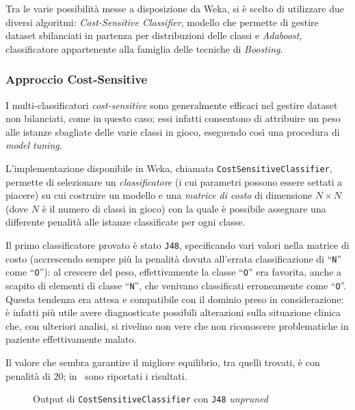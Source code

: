 Tra le varie possibilità messe a disposizione da Weka, si è scelto di utilizzare due diversi algoritmi:
\emph{Cost-Sensitive Classifier}, modello che permette di gestire dataset sbilanciati in partenza per distribuzioni delle classi e \emph{Adaboost}, classificatore appartenente alla famiglia delle tecniche di \emph{Boosting}.

\subsubsection{Approccio Cost-Sensitive}

I multi-classificatori \emph{cost-sensitive} sono generalmente efficaci nel gestire dataset non bilanciati, come in questo caso;
essi infatti consentono di attribuire un peso alle istanze sbagliate delle varie classi in gioco, eseguendo così una procedura di \emph{model tuning}.

L'implementazione disponibile in Weka, chiamata \texttt{CostSensitiveClassifier},
permette di selezionare un \emph{classificatore} (i cui parametri possono essere settati a piacere) su cui costruire un modello
e una \emph{matrice di costo} di dimensione \(N×N\) (dove \(N\) è il numero di classi in gioco) con la quale è possibile assegnare una differente penalità alle istanze classificate per ogni classe.

Il primo classificatore provato è stato \texttt{J48}, specificando vari valori nella matrice di costo (accrescendo sempre più la penalità dovuta all'errata classificazione di ``\texttt{N}'' come ``\texttt{O}''):
al crescere del peso, effettivamente la classe ``\texttt{O}'' era favorita, anche a scapito di elementi di classe ``\texttt{N}'', che venivano classificati erroneamente come ``\texttt{O}''.
Questa tendenza era attesa e compatibile con il dominio preso in considerazione:
è infatti più utile avere diagnosticate possibili alterazioni sulla situazione clinica che, con ulteriori analisi, si rivelino non vere che non riconoscere problematiche in paziente effettivamente malato.

Il valore che sembra garantire il migliore equilibrio, tra quelli trovati, è con penalità di \(20\);
in~ sono riportati i risultati.

\begin{figure}[H]
  \centering
  \caption{Output di \texttt{CostSensitiveClassifier} con \texttt{J48} \emph{unpruned}}%
  \label{fig:cost:j48}
\end{figure}


